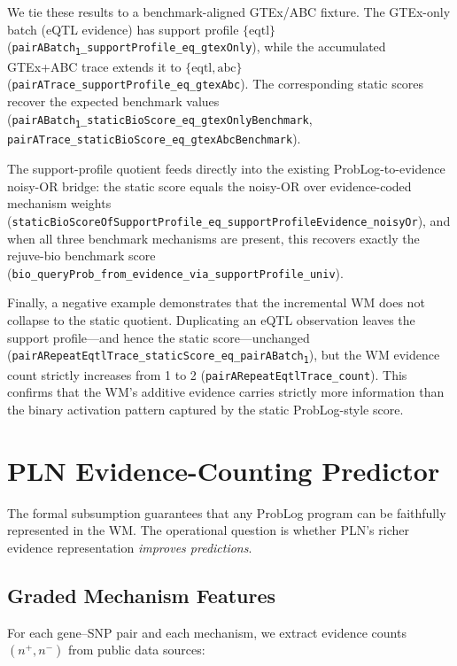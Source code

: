 \documentclass[]{article}
\newcommand{\code}[1]{\texttt{#1}}
\newcommand{\nplus}{\ensuremath{n^{+}}}
\newcommand{\nminus}{\ensuremath{n^{-}}}
\begin{document}
We tie these results to a benchmark-aligned GTEx/ABC fixture.  The GTEx-only
batch (eQTL evidence) has support profile $\{\mathrm{eqtl}\}$
(\code{pairABatch\textsubscript{1}\_supportProfile\_eq\_gtexOnly}),
while the accumulated GTEx+ABC trace extends it to
$\{\mathrm{eqtl}, \mathrm{abc}\}$
(\code{pairATrace\_supportProfile\_eq\_gtexAbc}).
The corresponding static scores recover the expected benchmark values
(\code{pairABatch\textsubscript{1}\_staticBioScore\_eq\_gtexOnlyBenchmark},
\code{pairATrace\_staticBioScore\_eq\_gtexAbcBenchmark}).

The support-profile quotient feeds directly into the existing ProbLog-to-evidence
noisy-OR bridge: the static score equals the noisy-OR over evidence-coded
mechanism weights
(\code{staticBioScoreOfSupportProfile\_eq\_supportProfileEvidence\_noisyOr}),
and when all three benchmark mechanisms are present, this recovers exactly the
rejuve-bio benchmark score
(\code{bio\_queryProb\_from\_evidence\_via\_supportProfile\_univ}).

Finally, a negative example demonstrates that the incremental WM does not
collapse to the static quotient.  Duplicating an eQTL observation leaves the
support profile---and hence the static score---unchanged
(\code{pairARepeatEqtlTrace\_staticScore\_eq\_pairABatch\textsubscript{1}}),
but the WM evidence count strictly increases from 1 to 2
(\code{pairARepeatEqtlTrace\_count}).
This confirms that the WM's additive evidence carries strictly more information
than the binary activation pattern captured by the static ProbLog-style score.

\section{PLN Evidence-Counting Predictor}
\label{sec:predictor}

The formal subsumption guarantees that any ProbLog program can be faithfully
represented in the WM.  The operational question is whether PLN's richer
evidence representation \emph{improves predictions}.

\subsection{Graded Mechanism Features}

For each gene--SNP pair and each mechanism, we extract evidence counts
$(\nplus, \nminus)$ from public data sources:
\end{document}
